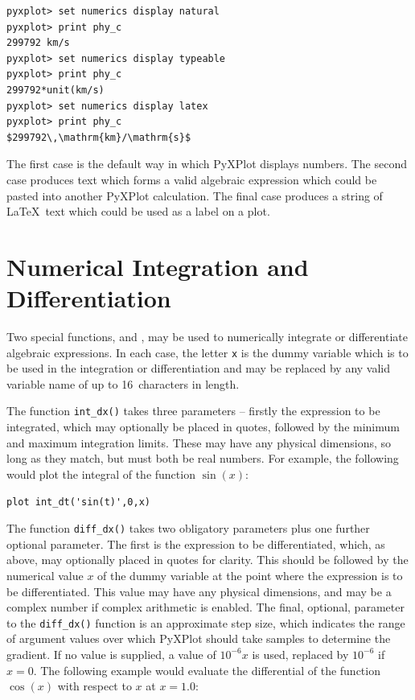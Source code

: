 \begin{verbatim}
pyxplot> set numerics display natural
pyxplot> print phy_c
299792 km/s
pyxplot> set numerics display typeable
pyxplot> print phy_c
299792*unit(km/s)
pyxplot> set numerics display latex
pyxplot> print phy_c
$299792\,\mathrm{km}/\mathrm{s}$
\end{verbatim}

The first case is the default way in which PyXPlot displays numbers. The second
case produces text which forms a valid algebraic expression which could be
pasted into another PyXPlot calculation. The final case produces a string of
\LaTeX\ text which could be used as a label on a plot.

\section{Numerical Integration and Differentiation}

 Two special functions,
 and , may be used to numerically
integrate or differentiate algebraic expressions.  In each case, the letter
{\tt x} is the dummy variable which is to be used in the integration or
differentiation and may be replaced by any valid variable name of up to
16~characters in length.

The function {\tt int\_dx()} takes three parameters -- firstly the expression
to be integrated, which may optionally be placed in quotes, followed by the
minimum and maximum integration limits. These may have any physical dimensions,
so long as they match, but must both be real numbers. For example, the
following would plot the integral of the function $\sin(x)$:

\begin{verbatim}
plot int_dt('sin(t)',0,x)
\end{verbatim} 

The function {\tt diff\_dx()} takes two obligatory parameters plus one further
optional parameter. The first is the expression to be differentiated, which,
as above, may optionally placed in quotes for clarity. This should be followed
by the numerical value $x$ of the dummy variable at the point where the
expression is to be differentiated. This value may have any physical
dimensions, and may be a complex number if complex arithmetic is enabled. The
final, optional, parameter to the {\tt diff\_dx()} function is an approximate
step size, which indicates the range of argument values over which PyXPlot
should take samples to determine the gradient. If no value is supplied, a value
of $10^{-6}x$ is used, replaced by $10^{-6}$ if $x=0$.  The following example
would evaluate the differential of the function $\cos(x)$ with respect to $x$
at $x=1.0$:

